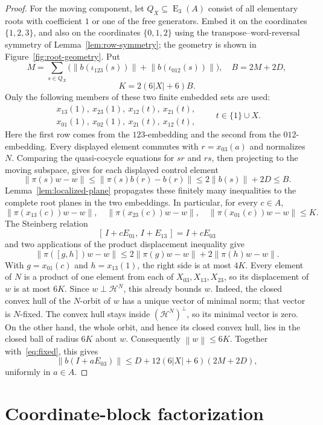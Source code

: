 \documentclass[11pt]{amsart}
\theoremstyle{definition}
\theoremstyle{plain}
\newcommand{\EL}{\operatorname{E}}
\newcommand{\norm}[1]{\left\lVert#1\right\rVert}
\newcommand{\abs}[1]{\left\lvert#1\right\rvert}
\begin{document}
\begin{proof}
For the moving component, let \(Q_X\subseteq\EL_3(A)\) consist of
all elementary roots with coefficient \(1\) or one of the free
generators.  Embed it on the coordinates \(\{1,2,3\}\), and also on
the coordinates \(\{0,1,2\}\) using the transpose--word-reversal
symmetry of Lemma~\ref{lem:row-symmetry}; the geometry is shown in
Figure~\ref{fig:root-geometry}.  Put
\[
 M=\sum_{s\in Q_X}
 \bigl(\norm{b(\iota_{123}(s))}+\norm{b(\iota_{012}(s))}\bigr),
 \quad B=2M+2D,
\]
\[
 K=2(6\abs X+6)B.
\]
Only the following members of these two finite embedded sets are
used:
\[
 \begin{array}{c}
 x_{13}(1),\ x_{23}(1),\ x_{12}(t),\ x_{21}(t),\\
 x_{01}(1),\ x_{02}(1),\ x_{21}(t),\ x_{12}(t),
 \end{array}
 \qquad t\in\{1\}\cup X.
\]
Here the first row comes from the \(123\)-embedding and the second
from the \(012\)-embedding.  Every displayed element commutes with
\(r=x_{03}(a)\) and normalizes \(N\).  Comparing the
quasi-cocycle equations for \(sr\) and \(rs\), then projecting to
the moving subspace, gives for each displayed control element
\[
  \norm{\pi(s)w-w}
  \le \norm{\pi(s)b(r)-b(r)}
  \le 2\norm{b(s)}+2D\le B.
\]
Lemma~\ref{lem:localized-plane} propagates these finitely many
inequalities to the complete root planes in the two embeddings.
In particular, for every \(c\in A\),
\[
 \norm{\pi(x_{13}(c))w-w},\quad
 \norm{\pi(x_{23}(c))w-w},\quad
 \norm{\pi(x_{01}(c))w-w}
 \le K.
\]
The Steinberg
relation
\[
  [\,I+cE_{01},\,I+E_{13}\,]=I+cE_{03}
\]
and two applications of the product displacement inequality give
\[
 \norm{\pi([g,h])w-w}
 \le2\norm{\pi(g)w-w}+2\norm{\pi(h)w-w}.
\]
With \(g=x_{01}(c)\) and \(h=x_{13}(1)\), the right side is at most
\(4K\).  Every element of \(N\) is a product of
one element from each of \(X_{03},X_{13},X_{23}\), so its
displacement of \(w\) is at most \(6K\).  Since
\(w\perp\mathcal H^N\), this already bounds \(w\).  Indeed, the
closed convex hull of the \(N\)-orbit of \(w\) has a unique vector
of minimal norm; that vector is \(N\)-fixed.  The convex hull stays
inside \((\mathcal H^N)^\perp\), so its minimal vector is zero.
On the other hand, the whole orbit, and hence its closed convex
hull, lies in the closed ball of radius \(6K\) about \(w\).
Consequently \(\norm w\le6K\).  Together with~\eqref{eq:fixed}, this gives
\[
  \norm{b(I+aE_{03})}
  \le
  D+12(6\abs X+6)(2M+2D),
\]
uniformly in \(a\in A\).
\end{proof}

\section{Coordinate-block factorization}\label{sec:factorization}
\end{document}
